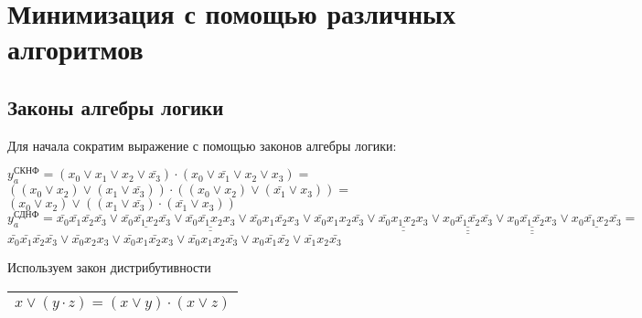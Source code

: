 \documentclass{bmstu}
\begin{document}
	\section{Минимизация с помощью различных алгоритмов}
	\subsection{Законы алгебры логики}
	Для начала сократим выражение с  помощью законов алгебры логики:
	\\

	\begin{center}
	$y^{\text{СКНФ}}_a = (x_0 \vee x_1 \vee x_2 \vee \bar{x_3}) \cdot (x_0 \vee \bar{x_1} \vee x_2 \vee x_3) =  $ \\
	$ ((x_0 \vee x_2) \vee (x_1 \vee \bar{x_3})) \cdot ((x_0 \vee x_2) \vee (\bar{x_1} \vee x_3)) =  $ \\
	$ (x_0 \vee x_2) \vee ((x_1 \vee \bar{x_3}) \cdot (\bar{x_1} \vee x_3))$
	\\
	$y^{\text{СДНФ}}_a = \bar{x_0} \bar{x_1} \bar{x_2} \bar{x_3} \vee
						 \underline{\bar{x_0} \bar{x_1} x_2 \bar{x_3}} \vee 
					     \underline{\underline{\bar{x_0} \bar{x_1} x_2 x_3}} \vee
						 \bar{x_0} x_1 \bar{x_2} x_3 \vee 
						 \bar{x_0} x_1 x_2 \bar{x_3} \vee 
						 \underline{\underline{\bar{x_0} x_1 x_2 x_3}} \vee 
						 \underline{\underline{\underline{x_0 \bar{x_1} \bar{x_2} \bar{x_3}}}} \vee 
						\underline{\underline{\underline{ x_0 \bar{x_1} \bar{x_2} x_3}}} \vee 
						 \underline{x_0 \bar{x_1} x_2 \bar{x_3}} = $
	$\bar{x_0} \bar{x_1} \bar{x_2} \bar{x_3} \vee
	 \bar{x_0} x_2 x_3 \vee
 	 \bar{x_0} x_1 \bar{x_2} x_3 \vee 
  	 \bar{x_0} x_1 x_2 \bar{x_3} \vee 
     x_0 \bar{x_1} \bar{x_2} \vee 
 	 \bar{x_1} x_2 \bar{x_3}$
	\end{center}

	
	Используем закон дистрибутивности
	\begin{center}
	   \begin{tabular}{ |c| } 
	     \hline
	       $x \vee (y \cdot z) = (x \vee y) \cdot (x \vee z)$ \\
	     \hline
	     \end{tabular}
	\end{center}
    
\end{document}
